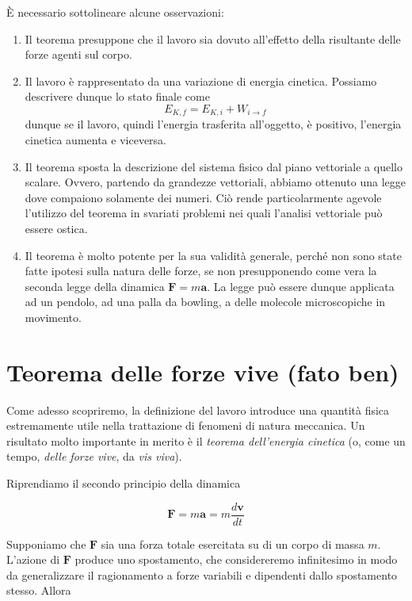 \noindent È necessario sottolineare alcune osservazioni:
\begin{enumerate}
    \item Il teorema presuppone che il lavoro sia dovuto all'effetto della risultante delle forze agenti sul corpo.
    \item Il lavoro è rappresentato da una variazione di energia cinetica. Possiamo descrivere dunque lo stato finale
    come \[ E_{K,f} = E_{K,i} + W_{i\to f} \] dunque se il lavoro, quindi l'energia trasferita all'oggetto, è positivo,
    l'energia cinetica aumenta e viceversa.

    \item Il teorema sposta la descrizione del sistema fisico dal piano vettoriale a quello scalare. Ovvero, partendo
    da grandezze vettoriali, abbiamo ottenuto una legge dove compaiono solamente dei numeri. Ciò rende particolarmente agevole
    l'utilizzo del teorema in svariati problemi nei quali l'analisi vettoriale può essere ostica.

    \item Il teorema è molto potente per la sua validità generale, perché non sono state fatte ipotesi sulla natura delle
    forze, se non presupponendo come vera la seconda legge della dinamica $\textbf{F} = m\textbf{a}$.
    La legge può essere dunque applicata ad un pendolo, ad una palla da bowling,
    a delle molecole microscopiche in movimento.
\end{enumerate}

\section*{Teorema delle forze vive (fato ben)}
Come adesso scopriremo, la definizione del lavoro introduce una
quantità fisica estremamente utile nella trattazione di fenomeni
di natura meccanica. Un risultato molto importante in merito è
il \textit{teorema dell'energia cinetica} (o, come un tempo,
\textit{delle forze vive}, da \textit{vis viva}).

Riprendiamo il secondo principio della dinamica

\[ \mathbf{F} = m \mathbf{a} = m \frac{d\mathbf{v}}{dt} \]

\noindent Supponiamo che $\mathbf{F}$ sia una forza totale esercitata su
di un corpo di massa $m$. L'azione di $\mathbf{F}$ produce uno
spostamento, che considereremo infinitesimo in modo da generalizzare
il ragionamento a forze variabili e dipendenti dallo spostamento
stesso. Allora

